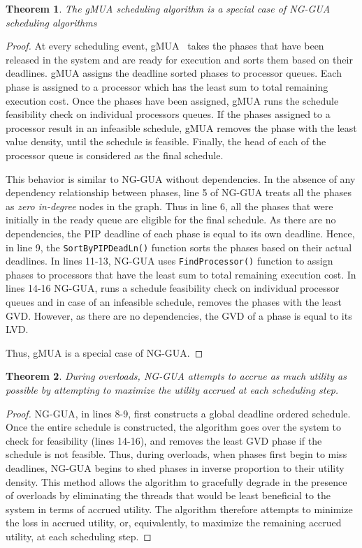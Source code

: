 \documentclass[12pt,dvips]{report}
\newtheorem{thm}{Theorem}
\begin{document}
\begin{thm}
The gMUA scheduling algorithm is a special case of NG-GUA scheduling algorithms
\end{thm}

\begin{proof}
At every scheduling event, gMUA~\cite{cho-thesis06} takes the phases that have been released in the system and are ready for execution and sorts them based on their deadlines. gMUA assigns the deadline sorted phases to processor queues. Each phase is assigned to a processor which has the least sum to total remaining execution cost. Once the phases have been assigned, gMUA runs the schedule feasibility check on individual processors queues. If the phases assigned to a processor result in an infeasible schedule, gMUA removes the phase with the least value density, until the schedule is feasible. Finally, the head of each of the processor queue is considered as the final schedule.

This behavior is similar to NG-GUA without dependencies. In the absence of any dependency relationship between phases, line 5 of NG-GUA treats all the phases as \textit{zero in-degree} nodes in the graph. Thus in line 6, all the phases that were initially in the ready queue are eligible for the final schedule. As there are no dependencies, the PIP deadline of each phase is equal to its own deadline. Hence, in line 9, the \texttt{SortByPIPDeadLn()} function sorts the phases based on their actual deadlines. In lines 11-13, NG-GUA uses \texttt{FindProcessor()} function to assign phases to processors that have the least sum to total remaining execution cost. In lines 14-16 NG-GUA, runs a schedule feasibility check on individual processor queues and in case of an infeasible schedule, removes the phases with the least GVD. However, as there are no dependencies, the GVD of a phase is equal to its LVD.

Thus, gMUA is a special case of NG-GUA.

\end{proof}

\begin{thm}During overloads, NG-GUA attempts to accrue as much utility as possible by attempting to maximize the utility accrued at each scheduling step.
\end{thm}

\begin{proof}NG-GUA, in lines 8-9, first constructs a global deadline ordered schedule. Once the entire schedule is constructed, the algorithm goes over the system to check for feasibility (lines 14-16), and removes the least GVD phase if the schedule is not feasible.
Thus, during overloads, when phases first begin to miss deadlines, NG-GUA begins to shed phases in inverse proportion to their utility density. This method allows the algorithm to gracefully degrade in the presence of overloads by eliminating the threads that would be least beneficial to the system in terms of accrued utility. The algorithm therefore attempts to minimize the loss in accrued utility, or, equivalently, to maximize the remaining accrued utility, at each scheduling step.
\end{proof}
\end{document}
